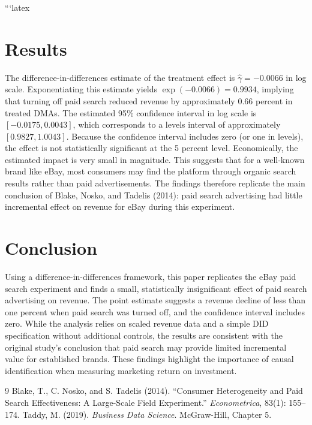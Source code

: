 ```latex \documentclass[12pt]{article} \usepackage[margin=1in]{geometry} \usepackage{graphicx} \usepackage{booktabs} \usepackage{amsmath}
\begin{document}
\section{Results}  The difference-in-differences estimate of the treatment effect is $\hat{\gamma} = -0.0066$ in log scale. Exponentiating this estimate yields $\exp(-0.0066) = 0.9934$, implying that turning off paid search reduced revenue by approximately 0.66 percent in treated DMAs. The estimated 95\% confidence interval in log scale is $[-0.0175, 0.0043]$, which corresponds to a levels interval of approximately $[0.9827, 1.0043]$. Because the confidence interval includes zero (or one in levels), the effect is not statistically significant at the 5 percent level. Economically, the estimated impact is very small in magnitude. This suggests that for a well-known brand like eBay, most consumers may find the platform through organic search results rather than paid advertisements. The findings therefore replicate the main conclusion of Blake, Nosko, and Tadelis (2014): paid search advertising had little incremental effect on revenue for eBay during this experiment. \section{Conclusion} Using a difference-in-differences framework, this paper replicates the eBay paid search experiment and finds a small, statistically insignificant effect of paid search advertising on revenue. The point estimate suggests a revenue decline of less than one percent when paid search was turned off, and the confidence interval includes zero. While the analysis relies on scaled revenue data and a simple DID specification without additional controls, the results are consistent with the original study’s conclusion that paid search may provide limited incremental value for established brands. These findings highlight the importance of causal identification when measuring marketing return on investment. \begin{thebibliography}{9}  Blake, T., C. Nosko, and S. Tadelis (2014). ``Consumer Heterogeneity and Paid Search Effectiveness: A Large-Scale Field Experiment.'' \textit{Econometrica}, 83(1): 155--174.  Taddy, M. (2019). \textit{Business Data Science}. McGraw-Hill, Chapter 5. \end{thebibliography} \end{document} ```
\end{document}
